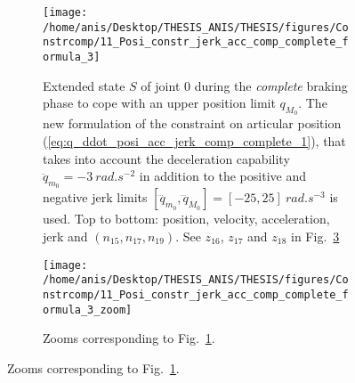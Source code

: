 \begin{figure}[!htbp]
%
\begin{figure}[!htbp]
\centering
\texttt{[image: /home/anis/Desktop/THESIS\_ANIS/THESIS/figures/Constrcomp/11\_Posi\_constr\_jerk\_acc\_comp\_complete\_formula\_3]}
\caption{Extended state $S$ of joint $0$ during the \textit{complete} braking phase to cope with an upper position limit $q_{M_{0}}$. The new formulation of the constraint on articular position (\ref{eq:q_ddot_posi_acc_jerk_comp_complete_1}), that takes into account the deceleration capability $\ddot{q}_{m_{0}}=-3~rad.s^{-2}$ in addition to the positive and negative jerk limits $[\dddot{q}_{m_{0}}, \dddot{q}_{M_{0}}] = [-25, 25]~rad.s^{-3}$ is used. Top to bottom: position, velocity, acceleration, jerk and $(n_{15}, n_{17}, n_{19})$. See $z_{16}$, $z_{17}$ and $z_{18}$ in Fig.~\ref{fig:11_Posi_constr_jerk_acc_comp_complete_formula_3_zoom}} 
\label{fig:11_Posi_constr_jerk_acc_comp_complete_formula_3}
\end{figure}
\begin{figure}[!htbp]
\centering
\texttt{[image: /home/anis/Desktop/THESIS\_ANIS/THESIS/figures/Constrcomp/11\_Posi\_constr\_jerk\_acc\_comp\_complete\_formula\_3\_zoom]}
\caption{Zooms corresponding to Fig.~\ref{fig:11_Posi_constr_jerk_acc_comp_complete_formula_3}.} 
\label{fig:11_Posi_constr_jerk_acc_comp_complete_formula_3_zoom}
\end{figure}

\end{figure}
